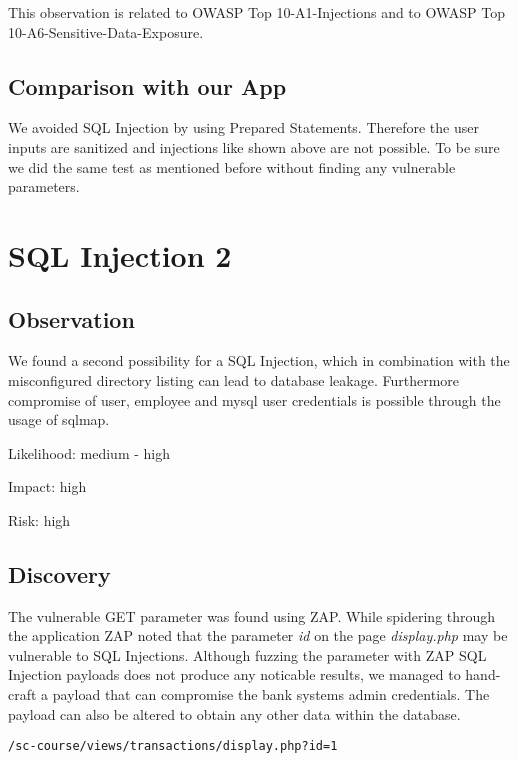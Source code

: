This observation is related to OWASP Top 10-A1-Injections and to OWASP Top 10-A6-Sensitive-Data-Exposure.

\subsection{Comparison with our App}
We avoided SQL Injection by using Prepared Statements. Therefore the user inputs are sanitized and injections like shown above are not possible. To be sure we did the same test as mentioned before without finding any vulnerable parameters.

\section{SQL Injection 2}

\subsection{Observation}

We found a second possibility for a SQL Injection, which in combination with the misconfigured directory listing can lead to database leakage. Furthermore compromise of user, employee and mysql user credentials is possible through the usage of sqlmap.\newline

Likelihood:  medium - high\newline

Impact: high\newline

Risk: high\newline

\subsection{Discovery}

The vulnerable GET parameter was found using ZAP. While spidering through the application ZAP noted that the parameter \emph{id} on the page \emph{display.php} may be vulnerable to SQL Injections. Although fuzzing the parameter with ZAP SQL Injection payloads does not produce any noticable results, we managed to hand-craft a payload that can compromise the bank systems admin credentials. The payload can also be altered to obtain any other data within the database.

\begin{lstlisting}[caption= The vulnerable parameter, label=listing:injection2parameter]
/sc-course/views/transactions/display.php?id=1
\end{lstlisting}


